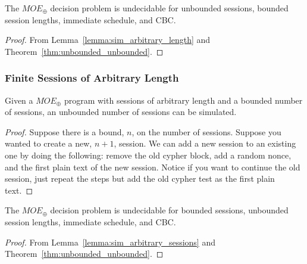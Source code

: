 \documentclass{llncs}
\begin{document}
\begin{theorem}\label{thm:bounded_unbounded}
The $MOE_{\oplus}$ decision problem is undecidable for unbounded 
sessions, bounded session lengths, immediate schedule, and CBC.	
\end{theorem}
\begin{proof}
	From Lemma~\ref{lemma:sim_arbitrary_length} 
	and Theorem~\ref{thm:unbounded_unbounded}.
\end{proof}

\subsubsection{Finite Sessions of Arbitrary Length}
\begin{lemma}\label{lemma:sim_arbitrary_sessions}
	Given a $MOE_{\oplus}$ program with sessions of arbitrary length
	and a bounded number of sessions,
	an unbounded number of sessions can be simulated. 	
\end{lemma}
\begin{proof}
	Suppose there is a bound, $n$, on the number of sessions. Suppose you wanted to create a new, $n+1$, session. We can add a new
	session to an existing one by doing the following: 
	remove the old cypher block, add a random nonce, and the 
	first plain text of the new session. Notice if you want to 
	continue the old session, just repeat the steps but add 
	the old cypher test as the first plain text.  
\end{proof}  

 
 \begin{theorem}\label{thm:unbounded_bounded}
 	The $MOE_{\oplus}$ decision problem is undecidable for bounded 
 	sessions, unbounded session lengths, immediate schedule, and CBC.	
 \end{theorem}
 \begin{proof}
 	From Lemma~\ref{lemma:sim_arbitrary_sessions} 
 	and Theorem~\ref{thm:unbounded_unbounded}.
 \end{proof}
\end{document}
